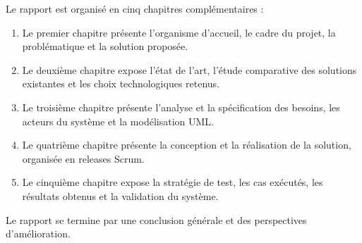 Le rapport est organisé en cinq chapitres complémentaires :
\begin{enumerate}
    \item Le premier chapitre présente l'organisme d'accueil, le cadre du
    projet, la problématique et la solution proposée.

    \item Le deuxième chapitre expose l'état de l'art, l'étude comparative
    des solutions existantes et les choix technologiques retenus.

    \item Le troisième chapitre présente l'analyse et la spécification
    des besoins, les acteurs du système et la modélisation UML.

    \item Le quatrième chapitre présente la conception et la réalisation
    de la solution, organisée en releases Scrum.

    \item Le cinquième chapitre expose la stratégie de test, les cas
    exécutés, les résultats obtenus et la validation du système.
\end{enumerate}

Le rapport se termine par une conclusion générale et des perspectives
d'amélioration.
